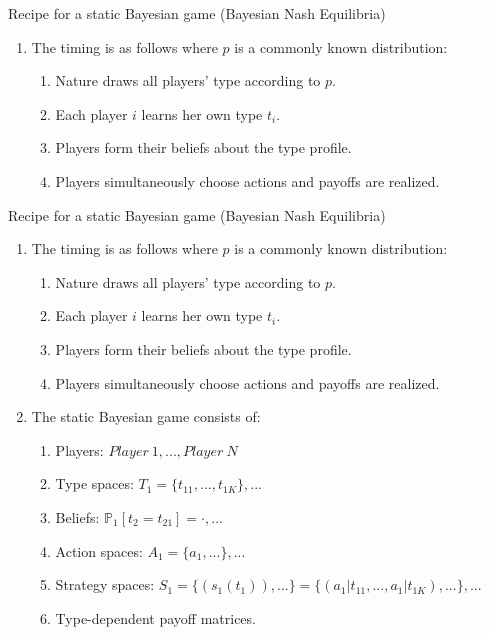 \begin{frame}{Recipe for a static Bayesian game (Bayesian Nash Equilibria)}
    \begin{enumerate}
      \item The timing is as follows where $p$ is a commonly known distribution:
      \begin{enumerate}\normalsize
        \item Nature draws all players' type according to $p$.
        \item Each player $i$ learns her own type $t_{i}$.
        \item Players form their beliefs about the type profile.
        \item Players simultaneously choose actions and payoffs are realized.
      \end{enumerate}
    \end{enumerate}
    \vfill\null
\end{frame}
\begin{frame}{Recipe for a static Bayesian game (Bayesian Nash Equilibria)}
    \begin{enumerate}
      \item The timing is as follows where $p$ is a commonly known distribution:
      \begin{enumerate}\normalsize
        \item Nature draws all players' type according to $p$.
        \item Each player $i$ learns her own type $t_{i}$.
        \item Players form their beliefs about the type profile.
        \item Players simultaneously choose actions and payoffs are realized.
      \end{enumerate}
      \item The static Bayesian game consists of:
      \begin{enumerate}\normalsize
        \item Players: $Player\ 1,...,Player\ N$
        \item Type spaces: $T_1=\{t_{11},...,t_{1K}\},...$
        \item Beliefs: $\mathbb{P}_1[t_2=t_{21}]=\cdot,...$
        \item Action spaces: $A_1=\{a_1,...\},...$
        \item Strategy spaces: $S_1=\{(s_1(t_1)),...\}=\{(a_1|t_{11},...,a_1|t_{1K}),...\},...$
        \item Type-dependent payoff matrices.
      \end{enumerate}
    \end{enumerate}
    \vfill\null
\end{frame}
